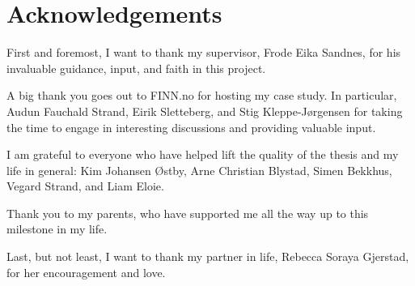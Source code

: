 \chapter*{Acknowledgements}

First and foremost, I want to thank my supervisor, Frode Eika Sandnes, for his invaluable guidance, input, and faith in this project.

A big thank you goes out to FINN.no for hosting my case study. In particular, Audun Fauchald Strand, Eirik Sletteberg, and Stig Kleppe-Jørgensen for taking the time to engage in interesting discussions and providing  valuable input.

I am grateful to everyone who have helped lift the quality of the thesis and my life in general: Kim Johansen Østby, Arne Christian Blystad, Simen Bekkhus, Vegard Strand, and Liam Eloie.

Thank you to my parents, who have supported me all the way up to this milestone in my life.

Last, but not least, I want to thank my partner in life, Rebecca Soraya Gjerstad, for her encouragement and love.
